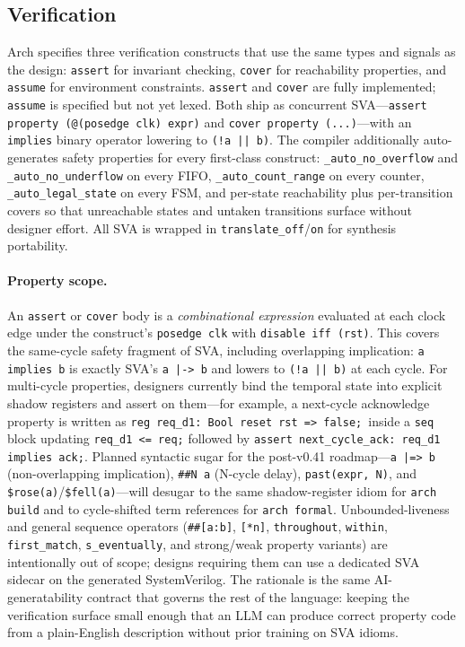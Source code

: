 \documentclass[11pt,twocolumn]{article}
\begin{document}
\subsection{Verification}\label{sec:formal}

Arch specifies three verification constructs that use the same types and signals as the design: \texttt{assert} for invariant checking, \texttt{cover} for reachability properties, and \texttt{assume} for environment constraints. \texttt{assert} and \texttt{cover} are fully implemented; \texttt{assume} is specified but not yet lexed. Both ship as concurrent SVA---\texttt{assert property (@(posedge clk) expr)} and \texttt{cover property (...)}---with an \texttt{implies} binary operator lowering to \texttt{(!a || b)}. The compiler additionally auto-generates safety properties for every first-class construct: \texttt{\_auto\_no\_overflow} and \texttt{\_auto\_no\_underflow} on every FIFO, \texttt{\_auto\_count\_range} on every counter, \texttt{\_auto\_legal\_state} on every FSM, and per-state reachability plus per-transition covers so that unreachable states and untaken transitions surface without designer effort. All SVA is wrapped in \texttt{translate\_off}/\texttt{on} for synthesis portability.

\paragraph{Property scope.} An \texttt{assert} or \texttt{cover} body is a \emph{combinational expression} evaluated at each clock edge under the construct's \texttt{posedge clk} with \texttt{disable iff (rst)}. This covers the same-cycle safety fragment of SVA, including overlapping implication: \texttt{a implies b} is exactly SVA's \texttt{a |-> b} and lowers to \texttt{(!a || b)} at each cycle. For multi-cycle properties, designers currently bind the temporal state into explicit shadow registers and assert on them---for example, a next-cycle acknowledge property is written as \texttt{reg req\_d1: Bool reset rst => false;}\ inside a \texttt{seq} block updating \texttt{req\_d1 <= req;} followed by \texttt{assert next\_cycle\_ack: req\_d1 implies ack;}. Planned syntactic sugar for the post-v0.41 roadmap---\texttt{a |=> b} (non-overlapping implication), \texttt{\#\#N a} (N-cycle delay), \texttt{past(expr, N)}, and \texttt{\$rose(a)}/\texttt{\$fell(a)}---will desugar to the same shadow-register idiom for \texttt{arch build} and to cycle-shifted term references for \texttt{arch formal}. Unbounded-liveness and general sequence operators (\texttt{\#\#[a:b]}, \texttt{[*n]}, \texttt{throughout}, \texttt{within}, \texttt{first\_match}, \texttt{s\_eventually}, and strong/weak property variants) are intentionally out of scope; designs requiring them can use a dedicated SVA sidecar on the generated SystemVerilog. The rationale is the same AI-generatability contract that governs the rest of the language: keeping the verification surface small enough that an LLM can produce correct property code from a plain-English description without prior training on SVA idioms.
\end{document}
